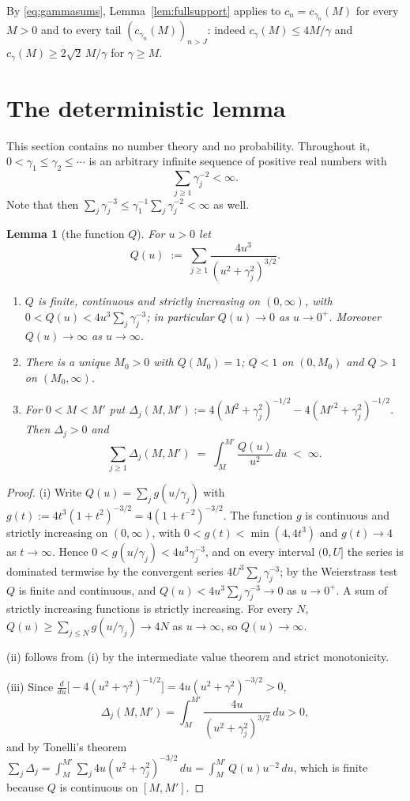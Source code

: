\documentclass[11pt]{amsart}
\newtheorem{lemma}[theorem]{Lemma}
\theoremstyle{definition}
\numberwithin{equation}{section}
\begin{document}
By \eqref{eq:gammasums}, Lemma~\ref{lem:fullsupport} applies to
$c_n=c_{\gamma_n}(M)$ for every $M>0$ and to every tail
$(c_{\gamma_n}(M))_{n>J}$: indeed $c_\gamma(M)\le4M/\gamma$ and
$c_\gamma(M)\ge2\sqrt2\,M/\gamma$ for $\gamma\ge M$.

\section{The deterministic lemma}\label{sec:det}

This section contains no number theory and no probability. Throughout
it, $0<\gamma_1\le\gamma_2\le\cdots$ is an arbitrary infinite sequence
of positive real numbers with
\begin{equation}\label{eq:hypgamma}
\sum_{j\ge1}\gamma_j^{-2}<\infty .
\end{equation}
Note that then $\sum_j\gamma_j^{-3}\le\gamma_1^{-1}\sum_j\gamma_j^{-2}
<\infty$ as well.

\begin{lemma}[the function $Q$]\label{lem:Q}
For $u>0$ let
\[
Q(u)\;:=\;\sum_{j\ge1}\frac{4u^3}{(u^2+\gamma_j^2)^{3/2}} .
\]
\begin{enumerate}
\item[(i)] $Q$ is finite, continuous and strictly increasing on
$(0,\infty)$, with $0<Q(u)<4u^3\sum_j\gamma_j^{-3}$; in particular
$Q(u)\to0$ as $u\to0^+$. Moreover $Q(u)\to\infty$ as $u\to\infty$.
\item[(ii)] There is a unique $M_0>0$ with $Q(M_0)=1$; $Q<1$ on
$(0,M_0)$ and $Q>1$ on $(M_0,\infty)$.
\item[(iii)] For $0<M<M'$ put
$\Delta_j(M,M'):=4(M^2+\gamma_j^2)^{-1/2}-4(M'^2+\gamma_j^2)^{-1/2}$.
Then $\Delta_j>0$ and
\[
\sum_{j\ge1}\Delta_j(M,M')\;=\;\int_M^{M'}\frac{Q(u)}{u^2}\,du\;<\;\infty .
\]
\end{enumerate}
\end{lemma}

\begin{proof}
(i) Write $Q(u)=\sum_jg(u/\gamma_j)$ with
$g(t):=4t^3(1+t^2)^{-3/2}=4(1+t^{-2})^{-3/2}$. The function $g$ is
continuous and strictly increasing on $(0,\infty)$, with
$0<g(t)<\min(4,4t^3)$ and $g(t)\to4$ as $t\to\infty$. Hence
$0<g(u/\gamma_j)<4u^3\gamma_j^{-3}$, and on every interval $(0,U]$ the
series is dominated termwise by the convergent series
$4U^3\sum_j\gamma_j^{-3}$; by the Weierstrass test $Q$ is finite and
continuous, and $Q(u)<4u^3\sum_j\gamma_j^{-3}\to0$ as $u\to0^+$. A sum
of strictly increasing functions is strictly increasing. For every
$N$, $Q(u)\ge\sum_{j\le N}g(u/\gamma_j)\to4N$ as $u\to\infty$, so
$Q(u)\to\infty$.

(ii) follows from (i) by the intermediate value theorem and strict
monotonicity.

(iii) Since $\frac{d}{du}\bigl[-4(u^2+\gamma^2)^{-1/2}\bigr]
=4u(u^2+\gamma^2)^{-3/2}>0$,
\[
\Delta_j(M,M')=\int_M^{M'}\frac{4u}{(u^2+\gamma_j^2)^{3/2}}\,du>0 ,
\]
and by Tonelli's theorem
$\sum_j\Delta_j=\int_M^{M'}\sum_j4u(u^2+\gamma_j^2)^{-3/2}\,du
=\int_M^{M'}Q(u)u^{-2}\,du$, which is finite because $Q$ is continuous
on $[M,M']$.
\end{proof}
\end{document}
